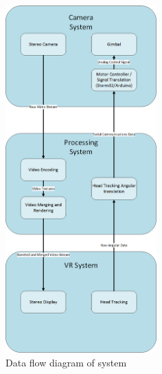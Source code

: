 \begin{figure}[h!]
	\centering
 	\includegraphics[width=0.52\textwidth]{images/overview}
	\caption{Data flow diagram of system}
\end{figure}
